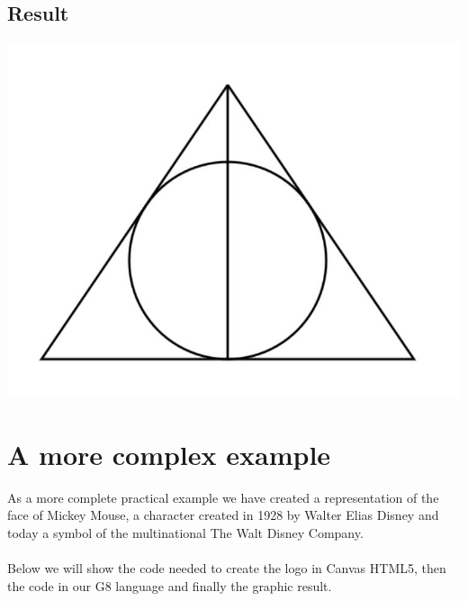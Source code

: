 \documentclass[a4paper]{article}
\begin{document}
\subsection{Result}
\begin{center}
 \includegraphics[scale=1.0]{hp.JPG}
 \end{center} 



\newpage


\section{A more complex example}

As a more complete practical example we have created a representation of the face of Mickey Mouse, a character created in 1928 by Walter Elias Disney and today a symbol of the multinational The Walt Disney Company.
\\
\\
Below we will show the code needed to create the logo in Canvas HTML5, then the code in our G8 language and finally the graphic result.
\end{document}
